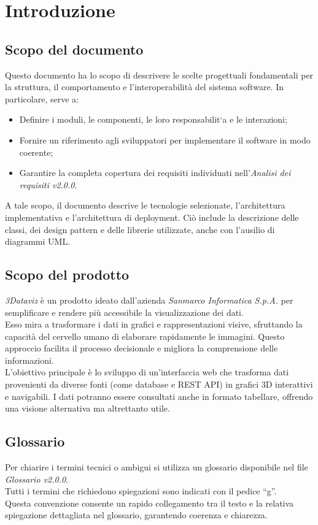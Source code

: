 \section{Introduzione}
\subsection{Scopo del documento}
Questo documento ha lo scopo di descrivere le scelte progettuali fondamentali
per la struttura, il comportamento e l'interoperabilità del sistema software.
In particolare, serve a:
\begin{itemize}
      \item Definire i moduli, le componenti, le loro responsabilit`a e le interazioni;
      \item Fornire un riferimento agli sviluppatori per implementare il software in modo
            coerente;
      \item Garantire la completa copertura dei requisiti individuati nell'\textit{Analisi
                  dei requisiti v2.0.0}.
\end{itemize}
A tale scopo, il documento descrive le tecnologie selezionate, l'architettura implementativa e l'architettura
di deployment. Ciò include la descrizione delle classi, dei design pattern e delle librerie utilizzate, anche
con l'ausilio di diagrammi UML.

\subsection{Scopo del prodotto}
\textit{3Dataviz} è un prodotto ideato dall'azienda \textit{Sanmarco Informatica S.p.A.} per semplificare e rendere più accessibile la visualizzazione dei dati.\\
Esso mira a trasformare i dati in grafici e rappresentazioni visive, sfruttando la capacità del cervello umano di elaborare rapidamente le immagini.
Questo approccio facilita il processo decisionale e migliora la comprensione delle informazioni.\\
L'obiettivo principale è lo sviluppo di un'interfaccia web che trasforma dati provenienti da diverse fonti (come database e REST API) in grafici 3D interattivi e navigabili.
I dati potranno essere consultati anche in formato tabellare, offrendo una visione alternativa ma altrettanto utile.

\subsection{Glossario}
Per chiarire i termini tecnici o ambigui si utilizza un glossario disponibile
nel file \textit{Glossario v2.0.0}.\\ Tutti i termini che richiedono
spiegazioni sono indicati con il pedice “g”. \\ Questa convenzione consente un
rapido collegamento tra il testo e la relativa spiegazione dettagliata nel
glossario, garantendo coerenza e chiarezza.

